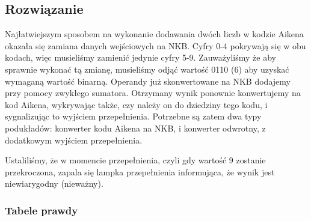 \documentclass[a4paper,12pt]{extarticle}  %
\begin{document}
\subsection{Rozwiązanie}
Najłatwiejszym sposobem na wykonanie dodawania dwóch liczb w kodzie Aikena okazała się zamiana danych wejściowych na NKB.
Cyfry 0-4 pokrywają się w obu kodach, więc musieliśmy zamienić jedynie cyfry 5-9.
Zauważyliśmy że aby sprawnie wykonać tą zmianę, musieliśmy odjąć wartość 0110 (6) aby uzyskać wymaganą wartość binarną.
Operandy już skonwertowane na NKB dodajemy przy pomocy zwykłego sumatora. Otrzymany wynik ponownie konwertujemy na kod Aikena, wykrywając także, czy należy on do dziedziny tego kodu, i sygnalizując to wyjściem przepełnienia.
Potrzebne są zatem dwa typy podukładów: konwerter kodu Aikena na NKB, i konwerter odwrotny, z dodatkowym wyjściem przepełnienia. 

Ustaliliśmy, że w momencie przepełnienia, czyli gdy wartość 9 zostanie przekroczona, zapala się lampka przepełnienia informująca, że wynik jest niewiarygodny (nieważny).


\subsubsection{Tabele prawdy} %
\end{document}
